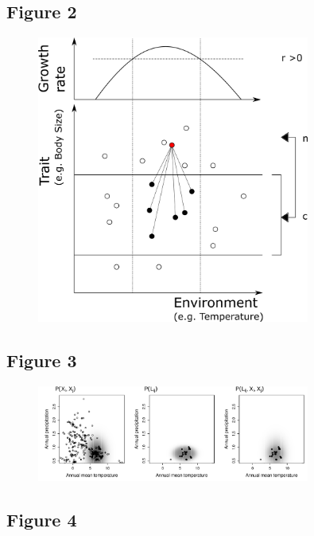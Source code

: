\documentclass[12pt]{article}
\begin{document}
\newpage

\subsection*{Figure 2}

\begin{figure}[ht!]
\centering\includegraphics[width=0.8\textwidth]{figures/integrated_niche}
\end{figure}

\newpage

\subsection*{Figure 3}

\begin{figure}[ht!]
\centering\includegraphics[width=0.8\textwidth]{figures/example_pair}
\end{figure}

\newpage

\subsection*{Figure 4}
\end{document}
